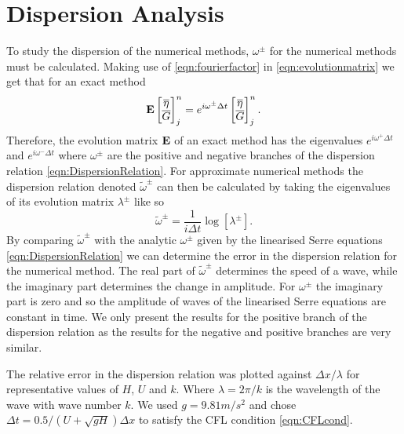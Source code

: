 \section{Dispersion Analysis}
To study the dispersion of the numerical methods, $\omega^\pm$ for the numerical methods must be calculated. Making use of \eqref{eqn:fourierfactor} in \eqref{eqn:evolutionmatrix} we get that for an exact method 
\begin{equation}\mathbf{E}\begin{bmatrix}
\overline{\eta} \\ \overline{G}
\end{bmatrix}^{n}_j = 
e^{i \omega^\pm \Delta t}\begin{bmatrix}
\overline{\eta} \\ \overline{G}
\end{bmatrix}^{n}_j.
\label{eqn:dispanalomeganum1}
\end{equation}
Therefore, the evolution matrix $\mathbf{E}$ of an exact method has the eigenvalues $e^{i \omega^+ \Delta t}$ and $e^{i \omega^- \Delta t}$ where $\omega^\pm$ are the positive and negative branches of the dispersion relation \eqref{eqn:DispersionRelation}. For approximate numerical methods the dispersion relation denoted $\widetilde{\omega}^\pm$ can then be calculated by taking the eigenvalues of its evolution matrix $\lambda^\pm$ like so
\begin{equation}
\widetilde{\omega}^\pm = \frac{1}{i \Delta t} \log\left[ \lambda^\pm\right].
\end{equation}
By comparing $\widetilde{\omega}^\pm$ with the analytic $\omega^\pm$ given by the linearised Serre equations \eqref{eqn:DispersionRelation} we can determine the error in the dispersion relation for the numerical method. The real part of $\widetilde{\omega}^\pm$ determines the speed of a wave, while the imaginary part determines the change in amplitude. For $\omega^\pm$ the imaginary part is zero and so the amplitude of waves of the linearised Serre equations are constant in time. We only present the results for the positive branch of the dispersion relation as the results for the negative and positive branches are very similar. 

The relative error in the dispersion relation was plotted against $\Delta x / \lambda$ for representative values of $H$, $U$ and $k$. Where $\lambda = 2 \pi / k$ is the wavelength of the wave with wave number $k$. We used $g = 9.81m/s^2$ and chose $\Delta t = 0.5 / \left(U + \sqrt{gH}\right) \Delta x$ to satisfy the CFL condition \eqref{eqn:CFLcond}.

